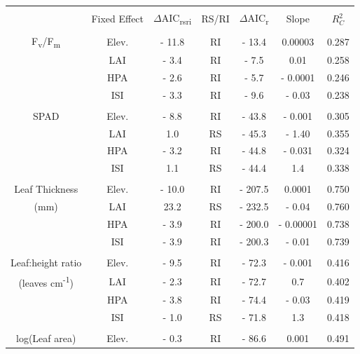 \documentclass[a4paper,10pt,]{report}
\begin{document}
\begin{table}[H] \centering 
  \label{} 
\begin{tabular}{@{\extracolsep{5pt}} ccScSS[table-figures-integer = 4, table-figures-decimal=3]
S} 
\\[-1.8ex]\hline 
\hline \\[-1.8ex] 
 & Fixed Effect & {$\Delta$AIC\textsubscript{rsri}} & {RS/RI} & {$\Delta$AIC\textsubscript{r}} & {Slope} & {$R_C^2$} \\ 
\hline \\[-1.8ex] 
F\textsubscript{v}/F\textsubscript{m} & Elev. &    - 11.8 & RI &    - 13.4 & 0.00003 & 0.287 \\ 
 & LAI &    - 3.4 & RI &    - 7.5 & 0.01 & 0.258 \\ 
 & HPA &    - 2.6 & RI &    - 5.7 &    - 0.0001  &  0.246  \\ 
 & ISI &    - 3.3 & RI &    - 9.6 &    - 0.03  &  0.238  \\ 
\hline \\[-1.8ex] 
SPAD & Elev. &    - 8.8 & RI &    - 43.8 &    - 0.001  &  0.305  \\ 
 & LAI &  1.0 & RS &    - 45.3 &    - 1.40  &  0.355  \\ 
 & HPA &    - 3.2 & RI &    - 44.8 &    - 0.031  &  0.324  \\ 
 & ISI &  1.1 & RS &    - 44.4 &  1.4  &  0.338  \\ 
\hline \\[-1.8ex] 
Leaf Thickness & Elev. &    - 10.0 & RI &    - 207.5 &  0.0001  &  0.750  \\ 
(mm) & LAI &  23.2 & RS &    - 232.5 &    - 0.04  &  0.760  \\ 
 & HPA &    - 3.9 & RI &    - 200.0 &    - 0.00001  &  0.738  \\ 
 & ISI &    - 3.9 & RI &    - 200.3 &    - 0.01  &  0.739  \\ 
\hline \\[-1.8ex] 
Leaf:height ratio & Elev. &    - 9.5 & RI &    - 72.3 &    - 0.001  &  0.416  \\ 
(leaves cm\textsuperscript{-1}) & LAI &    - 2.3 & RI &    - 72.7 &  0.7  &  0.402  \\ 
 & HPA &    - 3.8 & RI &    - 74.4 &    - 0.03  &  0.419  \\ 
 & ISI &    - 1.0 & RS &    - 71.8 &  1.3  &  0.418  \\ 
\hline \\[-1.8ex] 
log(Leaf area) & Elev. &    - 0.3 & RI &    - 86.6 &  0.001  &  0.491  \\ 

\end{tabular}
\end{table}
\end{document}
